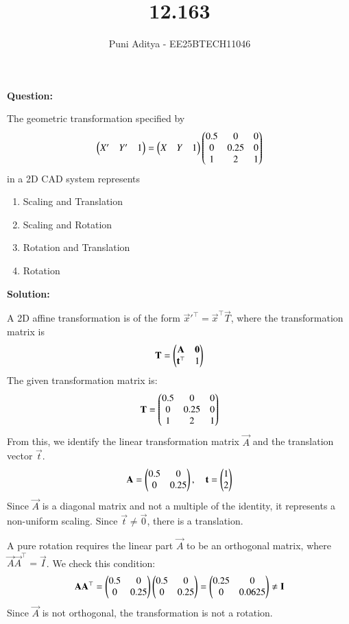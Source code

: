 \documentclass[journal]{IEEEtran}
\begin{document}
\title{12.163}
\author{Puni Aditya - EE25BTECH11046}
\maketitle

\textbf{Question:}

The geometric transformation specified by
\begin{align*}
    \begin{pmatrix}X' & Y' & 1\end{pmatrix} = \begin{pmatrix}X & Y & 1\end{pmatrix} \begin{pmatrix}0.5 & 0 & 0 \\ 0 & 0.25 & 0 \\ 1 & 2 & 1\end{pmatrix}
\end{align*}
in a 2D CAD system represents
\begin{enumerate}
    \item Scaling and Translation
    \item Scaling and Rotation
    \item Rotation and Translation
    \item Rotation
\end{enumerate}

\textbf{Solution:}

A 2D affine transformation is of the form $\vec{x}'^\top = \vec{x}^\top\vec{T}$, where the transformation matrix is
\begin{align*}
    \mathbf{T} = \begin{pmatrix}
        \mathbf{A} & \mathbf{0} \\
        \mathbf{t}^\top & 1
    \end{pmatrix}
\end{align*}
The given transformation matrix is:
\begin{align}
    \mathbf{T} = \begin{pmatrix}0.5 & 0 & 0 \\ 0 & 0.25 & 0 \\ 1 & 2 & 1\end{pmatrix}
\end{align}
From this, we identify the linear transformation matrix $\vec{A}$ and the translation vector $\vec{t}$.
\begin{align}
    \mathbf{A} = \begin{pmatrix}0.5 & 0 \\ 0 & 0.25\end{pmatrix}, \quad \mathbf{t} = \begin{pmatrix}1 \\ 2\end{pmatrix}
\end{align}
Since $\vec{A}$ is a diagonal matrix and not a multiple of the identity, it represents a non-uniform scaling. Since $\vec{t} \neq \vec{0}$, there is a translation.

A pure rotation requires the linear part $\vec{A}$ to be an orthogonal matrix, where $\vec{A}\vec{A}^\top = \vec{I}$. We check this condition:
\begin{align}
    \mathbf{A}\mathbf{A}^\top = \begin{pmatrix}0.5 & 0 \\ 0 & 0.25\end{pmatrix}\begin{pmatrix}0.5 & 0 \\ 0 & 0.25\end{pmatrix} = \begin{pmatrix}0.25 & 0 \\ 0 & 0.0625\end{pmatrix} \neq \mathbf{I}
\end{align}
Since $\vec{A}$ is not orthogonal, the transformation is not a rotation.
\end{document}
